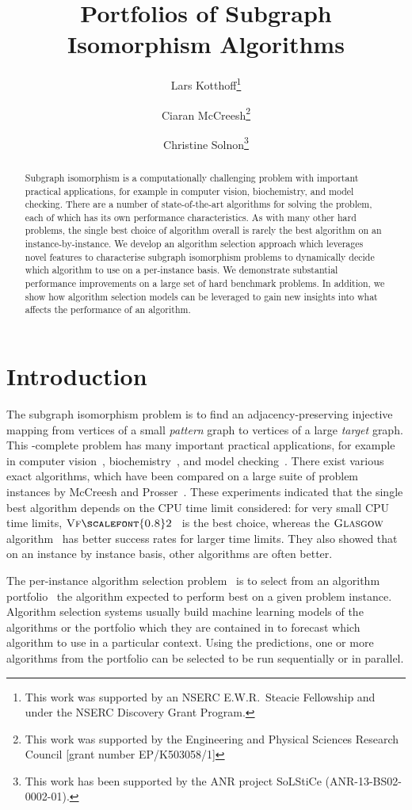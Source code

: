 \documentclass{llncs}
\title{Portfolios of Subgraph Isomorphism Algorithms}
\author{
    Lars Kotthoff\thanks{This work was supported by an NSERC E.W.R.\ Steacie
    Fellowship and under the NSERC Discovery Grant Program.}\inst{1}
    \and Ciaran McCreesh\thanks{This work was supported by the Engineering
        and Physical Sciences Research Council [grant number EP/K503058/1]}\inst{2}
    \and Christine Solnon\thanks{This work has been supported by the ANR project SoLStiCe (ANR-13-BS02-0002-01).}\inst{3}}
\institute{
    University of British Columbia, Vancouver, Canada
    \and University of Glasgow, Glasgow, Scotland
    \and INSA-Lyon, LIRIS, UMR5205, F-69621, France}
\newcommand{\VFtwo}{$\textsc{Vf{\scalefont{0.8}2}}$\xspace}
\newcommand{\Glasgow}{$\textsc{Glasgow}$\xspace}
\begin{document}
\maketitle

\begin{abstract}
Subgraph isomorphism is a computationally challenging problem with important practical
applications, for example in computer vision, biochemistry, and model checking. There are a number
of state-of-the-art algorithms for solving the problem, each of which has its own performance
characteristics. As with many other hard problems, the single best choice of algorithm overall is
rarely the best algorithm on an instance-by-instance. We develop an algorithm
selection approach which leverages
novel features to characterise subgraph isomorphism problems to dynamically decide which algorithm
to use on a per-instance basis. We demonstrate substantial performance improvements on a large set
of hard benchmark problems. In addition, we show how algorithm selection models can be leveraged to
gain new insights into what affects the performance of an algorithm.
\end{abstract}

\section{Introduction}

The subgraph isomorphism problem is to find an adjacency-preserving injective mapping from vertices
of a small \emph{pattern} graph to vertices of a large \emph{target} graph. This \NP-complete
problem has many important practical applications, for example in computer
vision~\cite{cviu11,pr15}, biochemistry~\cite{Giugno:2013}, and model checking~\cite{Sevegnani:2015}. There
exist various exact algorithms, which have been compared on a large suite of problem instances by
McCreesh and Prosser~\cite{McCreesh:2015}. These experiments indicated that the single best
algorithm depends on the CPU time limit considered: for very small CPU time
limits, \VFtwo{}~\cite{Cordella:2004} is the best choice, whereas the \Glasgow algorithm~\cite{McCreesh:2015} has
better success rates for larger time limits.  They also showed that on an instance by instance
basis, other algorithms are often better.


The per-instance algorithm selection problem~\cite{rice_algorithm_1976} is to select from an
algorithm portfolio~\cite{huberman_economics_1997,gomes_algorithm_2001} the
algorithm expected to perform
best on a given problem instance. Algorithm selection systems usually build machine learning models
of the algorithms or the portfolio which they are contained in to forecast which algorithm to use in a
particular context. Using the predictions, one or more algorithms from the
portfolio can be selected to be run sequentially or in parallel.
\end{document}
